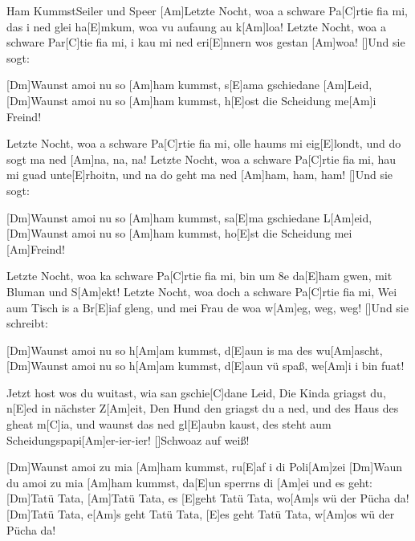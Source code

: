 \documentclass[../main.tex]{subfiles}
\begin{document}
\begin{song}{Ham Kummst}{Seiler und Speer}{}
[Am]Letzte Nocht, woa a schware Pa[C]rtie fia mi,
das i ned glei ha[E]mkum, woa vu aufaung au k[Am]loa!
Letzte Nocht, woa a schware Par[C]tie fia mi,
i kau mi ned eri[E]nnern wos gestan [Am]woa! 
[]Und sie sogt:

[Dm]Waunst amoi nu so [Am]ham kummst, s[E]ama gschiedane [Am]Leid,
[Dm]Waunst amoi nu so [Am]ham kummst, h[E]ost die Scheidung me[Am]i Freind!

Letzte Nocht, woa a schware Pa[C]rtie fia mi,
olle haums mi eig[E]londt,
und do sogt ma ned [Am]na, na, na!
Letzte Nocht, woa a schware Pa[C]rtie fia mi,
hau mi guad unte[E]rhoitn, und na do geht ma ned [Am]ham, ham, ham! 
[]Und sie sogt:

[Dm]Waunst amoi nu so [Am]ham kummst, sa[E]ma gschiedane L[Am]eid,
[Dm]Waunst amoi nu so [Am]ham kummst, ho[E]st die Scheidung mei [Am]Freind!

Letzte Nocht, woa ka schware Pa[C]rtie fia mi, bin um 8e da[E]ham gwen,
mit Bluman und S[Am]ekt!
Letzte Nocht, woa doch a schware Pa[C]rtie fia mi,
Wei aum Tisch is a Br[E]iaf gleng, und mei Frau de woa w[Am]eg, weg, weg! 
[]Und sie schreibt:

[Dm]Waunst amoi nu so h[Am]am kummst, d[E]aun is ma des wu[Am]ascht,
[Dm]Waunst amoi nu so h[Am]am kummst, d[E]aun vü spaß, we[Am]i i bin fuat!

Jetzt host wos du wuitast, wia san gschie[C]dane Leid,
Die Kinda griagst du, n[E]ed in nächster Z[Am]eit,
Den Hund den griagst du a ned, und des Haus des gheat m[C]ia,
und waunst das ned gl[E]aubn kaust, des steht aum Scheidungspapi[Am]er-ier-ier! 
[]Schwoaz auf weiß!

[Dm]Waunst amoi zu mia [Am]ham kummst, ru[E]af i di Poli[Am]zei
[Dm]Waun du amoi zu mia [Am]ham kummst, da[E]un sperrns di [Am]ei und es geht:
[Dm]Tatü Tata, [Am]Tatü Tata, es [E]geht Tatü Tata, wo[Am]s wü der Pücha da!
[Dm]Tatü Tata, e[Am]s geht Tatü Tata, [E]es geht Tatü Tata, w[Am]os wü der Pücha da!
\end{song}
\end{document}
